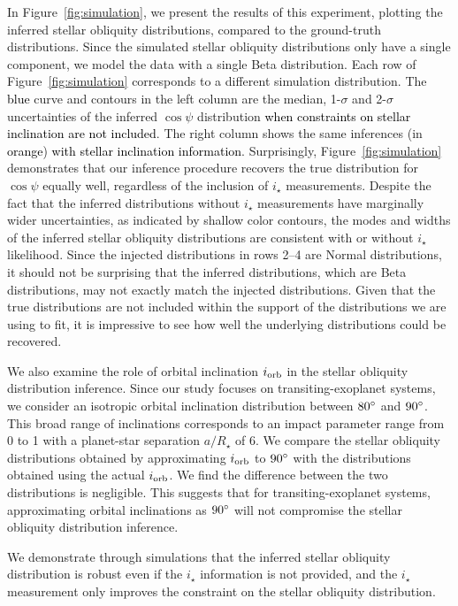\documentclass[twocolumn,times]{aastex631}
\newcommand{\edits}[1]{\textcolor{black}{#1}}
\begin{document}
In Figure~\ref{fig:simulation}, we present the results of this experiment, plotting the inferred stellar obliquity distributions, compared to the ground-truth distributions.
Since the simulated stellar obliquity distributions only have a single component, we model the data with a single Beta distribution.
Each row of Figure~\ref{fig:simulation} corresponds to a different simulation distribution. The \edits{blue} curve and contours in the left column are the median, 1-$\sigma$ and 2-$\sigma$ uncertainties of the inferred $\cos{\psi}$ distribution \edits{when constraints on stellar inclination are not included}.
The right column shows the same inferences (in \edits{orange}) \edits{with stellar inclination information}.
Surprisingly, Figure~\ref{fig:simulation} demonstrates that our inference procedure recovers the true distribution for $\cos{\psi}$ equally well, regardless of the inclusion of $i_\star$ measurements.
Despite the fact that the inferred distributions without $i_\star$ measurements have marginally wider uncertainties, as indicated by shallow color contours, the modes and widths of the inferred stellar obliquity distributions are consistent with or without $i_\star$ likelihood.
Since the injected distributions in rows 2--4 are Normal distributions, it should not be surprising that the inferred distributions, which are Beta distributions, may not exactly match the injected distributions. Given that the true distributions are not included within the support of the distributions we are using to fit, it is impressive to see how well the underlying distributions could be recovered.

We also examine the role of orbital inclination $i_{\rm orb}$ in the stellar obliquity distribution inference. Since our study focuses on transiting-exoplanet systems, we consider an isotropic orbital inclination distribution between $80\mbox{$^\circ$}$ and $90\mbox{$^\circ$}$. This broad range of inclinations corresponds to an impact parameter range from 0 to 1 with a planet-star separation $a/R_\star$ of 6.
We compare the stellar obliquity distributions obtained by approximating $i_{\rm orb}$ to $90\mbox{$^\circ$}$ with the distributions obtained using the actual $i_{\rm orb}$. We find the difference between the two distributions is negligible. This suggests that for transiting-exoplanet systems, approximating orbital inclinations as $90\mbox{$^\circ$}$ will not compromise the stellar obliquity distribution inference.

We demonstrate through simulations that the inferred stellar obliquity distribution is robust even if the $i_\star$ information is not provided, and the $i_\star$ measurement only improves the constraint on the stellar obliquity distribution.
\end{document}
